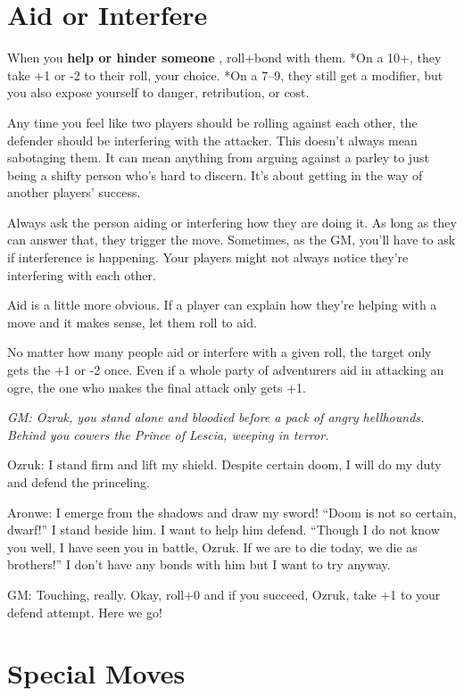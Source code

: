 \section*{Aid or Interfere}
\HRule
When you \textbf{help or hinder someone }
, roll+bond with them. *On a 10+, they take +1 or -2 to their roll, your choice. *On a 7--9, they still get a modifier, but you also expose yourself to danger, retribution, or cost.
\HRule

Any time you feel like two players should be rolling against each other, the defender should be interfering with the attacker. This doesn't always mean sabotaging them. It can mean anything from arguing against a parley to just being a shifty person who's hard to discern. It's about getting in the way of another players' success.

Always ask the person aiding or interfering how they are doing it. As long as they can answer that, they trigger the move. Sometimes, as the GM, you'll have to ask if interference is happening. Your players might not always notice they're interfering with each other.

Aid is a little more obvious. If a player can explain how they're helping with a move and it makes sense, let them roll to aid.

No matter how many people aid or interfere with a given roll, the target only gets the +1 or -2 once. Even if a whole party of adventurers aid in attacking an ogre, the one who makes the final attack only gets +1.

{\itshape
GM: Ozruk, you stand alone and bloodied before a pack of angry hellhounds. Behind you cowers the Prince of Lescia, weeping in terror.

Ozruk: I stand firm and lift my shield. Despite certain doom, I will do my duty and defend the princeling.

Aronwe: I emerge from the shadows and draw my sword! ``Doom is not so certain, dwarf!'' I stand beside him. I want to help him defend. ``Though I do not know you well, I have seen you in battle, Ozruk. If we are to die today, we die as brothers!'' I don't have any bonds with him but I want to try anyway.

GM: Touching, really. Okay, roll+0 and if you succeed, Ozruk, take +1 to your defend attempt. Here we go!
}
\section*{Special Moves}

